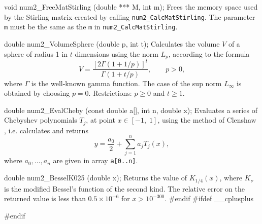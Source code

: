 {void num2_FreeMatStirling (double *** M, int m);
\endcode
  \tab Frees the memory space used by the Stirling matrix created by calling
  {\tt num2\_CalcMatStirling}. The parameter {\tt m}
  must be the same as the {\tt m} in  {\tt num2\_CalcMatStirling}.
  \endtab
\code

double num2_VolumeSphere (double p, int t);
\endcode
\tab Calculates the volume $V$ of a sphere of radius 1 in $t$ dimensions
  using the norm $L_p$, according to the formula
$$
       V = \frac{\left[2 \Gamma(1 + 1/p)\right]^t}
             {\Gamma\left(1 + t/p\right)}, \qquad p > 0,
$$
  where $\Gamma$ is the well-known gamma function.
  The case of the sup norm $L_\infty$ is
  obtained by choosing $p=0$.
  Restrictions: $p\ge 0$ and $t\ge 1$.
  \endtab
\code

double num2_EvalCheby (const double a[], int n, double x);
\endcode
\tab Evaluates a series of Chebyshev polynomials $T_j$, at point
  $x \in [-1, \;1]$, using the method of Clenshaw \cite{mCLE62a},
   i.e. calculates and  returns
  $$
    y = \frac{a_0}2 + \sum_{j=1}^n a_j T_j(x),
  $$
where $a_0,\dots,a_n$	are given in array \texttt{a[0..n]}.
\endtab
\code

double num2_BesselK025 (double x);
\endcode
\tab Returns the value of $K_{1/4}(x)$, where $K_{\nu}$ is the modified
  Bessel's function of the second kind.
  The relative error on the returned value is less than
  $0.5\times 10^{-6}$ for $x > 10^{-300}$.
\endtab
\code\hide
#endif
#ifdef __cplusplus
}
#endif
\endhide\endcode





